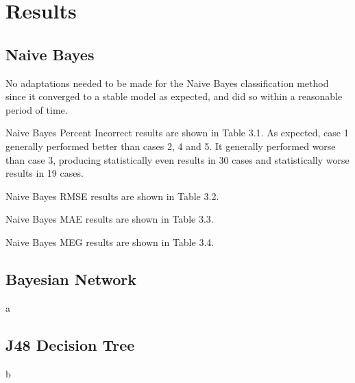 \section{Results}
\subsection{Naive Bayes}
No adaptations needed to be made for the Naive Bayes classification method since it converged to a stable model as expected, and did so within a reasonable period of time.

Naive Bayes Percent Incorrect results are shown in Table 3.1. As expected, case 1 generally performed better than cases 2, 4 and 5. It generally performed worse than case 3, producing statistically even results in 30 cases and statistically worse results in 19 cases.

Naive Bayes RMSE results are shown in Table 3.2.

Naive Bayes MAE results are shown in Table 3.3.

Naive Bayes MEG results are shown in Table 3.4.






\subsection{Bayesian Network}
a
\subsection{J48 Decision Tree}
b